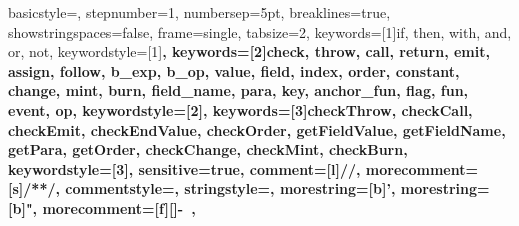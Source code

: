 %
{
  basicstyle=\ttfamily,
  stepnumber=1,
  numbersep=5pt,
  breaklines=true,
  showstringspaces=false,
  frame=single,
  tabsize=2,
  keywords=[1]{if, then, with, and, or, not}, %
  keywordstyle=[1]\color{blue}\bfseries,
  keywords=[2]{check, throw, call, return, emit, assign, follow, b_exp, b_op,
  value, field, index, order, constant, change, mint, burn, field_name, para, key, anchor_fun, flag, fun, event, op},	%
	keywordstyle=[2]\color{teal}\bfseries,
 keywords=[3]{checkThrow, checkCall, checkEmit, checkEndValue, checkOrder, getFieldValue, getFieldName,  getPara, getOrder, checkChange, checkMint, checkBurn},	%
	keywordstyle=[3]\color{violet}\bfseries,
  sensitive=true,
	comment=[l]{//},
	morecomment=[s]{/*}{*/},
	commentstyle=\color{gray}\ttfamily,
	stringstyle=\color{black}\ttfamily,
	morestring=[b]',
	morestring=[b]",
  morecomment=[f][\color{red}]{-\ },
}